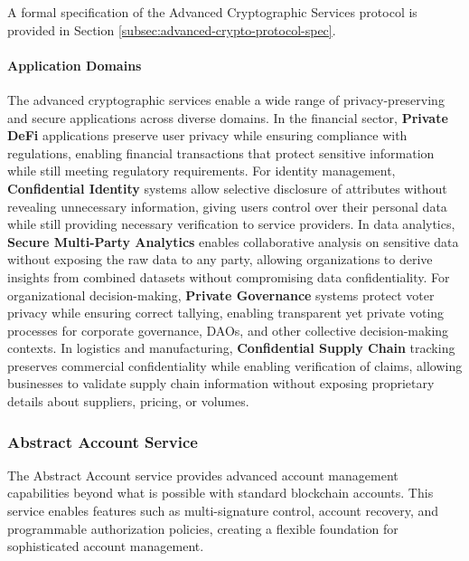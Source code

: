 \documentclass[11pt]{article}
\begin{document}
A formal specification of the Advanced Cryptographic Services protocol is provided in Section \ref{subsec:advanced-crypto-protocol-spec}.



\paragraph{Application Domains}
The advanced cryptographic services enable a wide range of privacy-preserving and secure applications across diverse domains. In the financial sector, \textbf{Private DeFi} applications preserve user privacy while ensuring compliance with regulations, enabling financial transactions that protect sensitive information while still meeting regulatory requirements. For identity management, \textbf{Confidential Identity} systems allow selective disclosure of attributes without revealing unnecessary information, giving users control over their personal data while still providing necessary verification to service providers. In data analytics, \textbf{Secure Multi-Party Analytics} enables collaborative analysis on sensitive data without exposing the raw data to any party, allowing organizations to derive insights from combined datasets without compromising data confidentiality. For organizational decision-making, \textbf{Private Governance} systems protect voter privacy while ensuring correct tallying, enabling transparent yet private voting processes for corporate governance, DAOs, and other collective decision-making contexts. In logistics and manufacturing, \textbf{Confidential Supply Chain} tracking preserves commercial confidentiality while enabling verification of claims, allowing businesses to validate supply chain information without exposing proprietary details about suppliers, pricing, or volumes.

\subsubsection{Abstract Account Service}
\label{subsubsec:abstract-account}

The Abstract Account service provides advanced account management capabilities beyond what is possible with standard blockchain accounts. This service enables features such as multi-signature control, account recovery, and programmable authorization policies, creating a flexible foundation for sophisticated account management.


\end{document}
